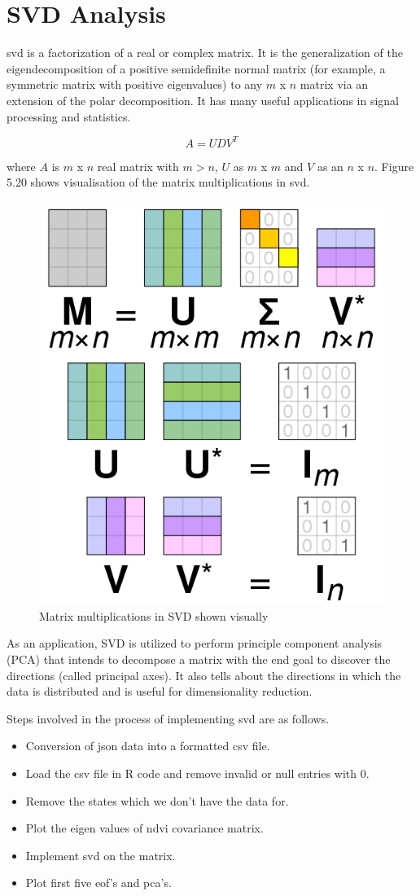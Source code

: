 \section{SVD Analysis}

\gls{svd} is a factorization of a real or complex matrix.  It is the generalization of the eigendecomposition of a positive semidefinite normal matrix (for example, a symmetric matrix with positive eigenvalues) to any $m$ x $n$ matrix via an extension of the polar decomposition. It has many useful applications in signal processing and statistics. \cite{SVD}

\begin{equation} \label{eq:svd_formula}
 A = UDV^{T}
\end{equation}

where $A$ is $m$ x $n$ real matrix with $m>n$, $U$ as $m$ x $m$ and $V$ as an $n$ x $n$. Figure 5.20 shows visualisation of the matrix multiplications in \gls{svd}.

    \begin{figure}[H]
            \centering
            \includegraphics[width=0.5\linewidth]{figures/ch5/svd_matrix.png}
            \caption{\label{fig:svd_matrix} Matrix multiplications in SVD shown visually \cite{SVD}}
    \end{figure}

As an application, SVD is utilized to perform principle component analysis (PCA) that intends to decompose a matrix with the end goal to discover the directions (called principal axes). It also tells about the directions in which the data is distributed and is useful for dimensionality reduction. 

Steps involved in the process of implementing \gls{svd} are as follows.

\begin{itemize}
    \item Conversion of \gls{json} data into a formatted \gls{csv} file.
    \item Load the csv file in R code and remove invalid or null entries with 0.
    \item Remove the states which we don't have the data for.
    \item Plot the eigen values of \gls{ndvi} covariance matrix.
    \item Implement \gls{svd} on the matrix.
    \item Plot first five \gls{eof}'s and \gls{pca}'s.
\end{itemize}

